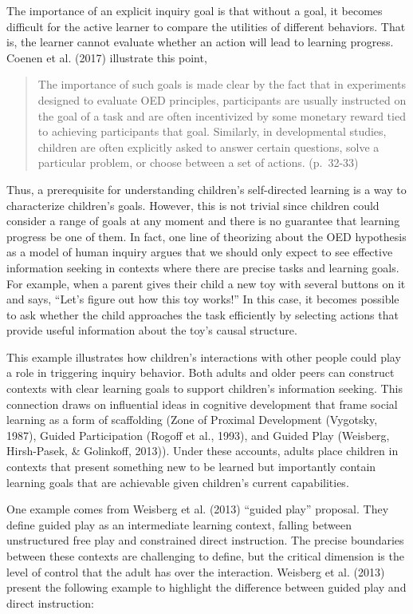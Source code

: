 \documentclass[english,floatsintext,man]{apa6}
\theoremstyle{definition}
\theoremstyle{definition}
\theoremstyle{definition}
\theoremstyle{remark}
\begin{document}
\noindent
The importance of an explicit inquiry goal is that without a goal, it
becomes difficult for the active learner to compare the utilities of
different behaviors. That is, the learner cannot evaluate whether an
action will lead to learning progress. Coenen et al. (2017) illustrate
this point,

\begin{quote}
The importance of such goals is made clear by the fact that in
experiments designed to evaluate OED principles, participants are
usually instructed on the goal of a task and are often incentivized by
some monetary reward tied to achieving participants that goal.
Similarly, in developmental studies, children are often explicitly asked
to answer certain questions, solve a particular problem, or choose
between a set of actions. (p.~32-33)
\end{quote}

\noindent
Thus, a prerequisite for understanding children's self-directed learning
is a way to characterize children's goals. However, this is not trivial
since children could consider a range of goals at any moment and there
is no guarantee that learning progress be one of them. In fact, one line
of theorizing about the OED hypothesis as a model of human inquiry
argues that we should only expect to see effective information seeking
in contexts where there are precise tasks and learning goals. For
example, when a parent gives their child a new toy with several buttons
on it and says, \enquote{Let's figure out how this toy works!} In this
case, it becomes possible to ask whether the child approaches the task
efficiently by selecting actions that provide useful information about
the toy's causal structure.

This example illustrates how children's interactions with other people
could play a role in triggering inquiry behavior. Both adults and older
peers can construct contexts with clear learning goals to support
children's information seeking. This connection draws on influential
ideas in cognitive development that frame social learning as a form of
scaffolding (Zone of Proximal Development (Vygotsky, 1987), Guided
Participation (Rogoff et al., 1993), and Guided Play (Weisberg,
Hirsh-Pasek, \& Golinkoff, 2013)). Under these accounts, adults place
children in contexts that present something new to be learned but
importantly contain learning goals that are achievable given children's
current capabilities.

One example comes from Weisberg et al. (2013) \enquote{guided play}
proposal. They define guided play as an intermediate learning context,
falling between unstructured free play and constrained direct
instruction. The precise boundaries between these contexts are
challenging to define, but the critical dimension is the level of
control that the adult has over the interaction. Weisberg et al. (2013)
present the following example to highlight the difference between guided
play and direct instruction:
\end{document}
